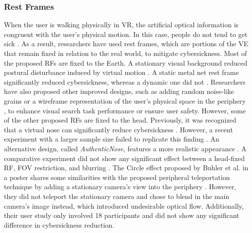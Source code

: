 \subsubsection{Rest Frames}
When the user is walking physically in VR, the artificial optical information is congruent with the user's physical motion.
In this case, people do not tend to get sick \cite{chance_locomotion_1998}. 
As a result, researchers have used rest frames, which are portions of the VE that remain fixed in relation to the real world, to mitigate cybersickness.
Most of the proposed RFs are fixed to the Earth.
A stationary visual background reduced postural disturbance induced by virtual motion \cite{duh_independent_2001}. A static metal net rest frame significantly reduced cybersickness, whereas a dynamic one did not \cite{cao_visually-induced_2018}. Researchers have also proposed other improved designs, such as adding random noise-like grains \cite{cao_granulated_2021} or a wireframe representation of the user's physical space in the periphery \cite{wu_combining_2019}, to enhance visual search task performance or ensure user safety.
However, some of the other proposed RFs are fixed to the head.
Previously, it was recognized that a virtual nose can significantly reduce cybersickness \cite{wienrich_virtual_2018}. However, a recent experiment with a larger sample size failed to replicate this finding \cite{yip_preregistered_2024}. An alternative design, called \textit{AuthenticNose}, features a more realistic appearance \cite{ang_gingervr_2020}. A comparative experiment did not show any significant effect between a head-fixed RF, FOV restriction, and blurring \cite{shi_virtual_2021}.
The Circle effect proposed by Buhler et al. in a poster shares some similarities with the proposed peripheral teleportation technique by adding a stationary camera's view into the periphery \cite{buhler_reducing_2018}.
However, they did not teleport the stationary camera and chose to blend in the main camera's image instead, which introduced undesirable optical flow.
Additionally, their user study only involved 18 participants and did not show any significant difference in cybersickness reduction.



